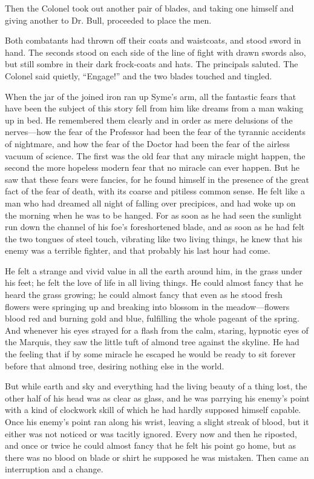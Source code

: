 Then the Colonel took out another pair of blades, and taking one himself and giving another to Dr. Bull, proceeded to place the men.

Both combatants had thrown off their coats and waistcoats, and stood sword in hand. The seconds stood on each side of the line of fight with drawn swords also, but still sombre in their dark frock-coats and hats. The principals saluted. The Colonel said quietly, “Engage!” and the two blades touched and tingled.

When the jar of the joined iron ran up Syme’s arm, all the fantastic fears that have been the subject of this story fell from him like dreams from a man waking up in bed. He remembered them clearly and in order as mere delusions of the nerves⁠—how the fear of the Professor had been the fear of the tyrannic accidents of nightmare, and how the fear of the Doctor had been the fear of the airless vacuum of science. The first was the old fear that any miracle might happen, the second the more hopeless modern fear that no miracle can ever happen. But he saw that these fears were fancies, for he found himself in the presence of the great fact of the fear of death, with its coarse and pitiless common sense. He felt like a man who had dreamed all night of falling over precipices, and had woke up on the morning when he was to be hanged. For as soon as he had seen the sunlight run down the channel of his foe’s foreshortened blade, and as soon as he had felt the two tongues of steel touch, vibrating like two living things, he knew that his enemy was a terrible fighter, and that probably his last hour had come.

He felt a strange and vivid value in all the earth around him, in the grass under his feet; he felt the love of life in all living things. He could almost fancy that he heard the grass growing; he could almost fancy that even as he stood fresh flowers were springing up and breaking into blossom in the meadow⁠—flowers blood red and burning gold and blue, fulfilling the whole pageant of the spring. And whenever his eyes strayed for a flash from the calm, staring, hypnotic eyes of the Marquis, they saw the little tuft of almond tree against the skyline. He had the feeling that if by some miracle he escaped he would be ready to sit forever before that almond tree, desiring nothing else in the world.

But while earth and sky and everything had the living beauty of a thing lost, the other half of his head was as clear as glass, and he was parrying his enemy’s point with a kind of clockwork skill of which he had hardly supposed himself capable. Once his enemy’s point ran along his wrist, leaving a slight streak of blood, but it either was not noticed or was tacitly ignored. Every now and then he riposted, and once or twice he could almost fancy that he felt his point go home, but as there was no blood on blade or shirt he supposed he was mistaken. Then came an interruption and a change.

